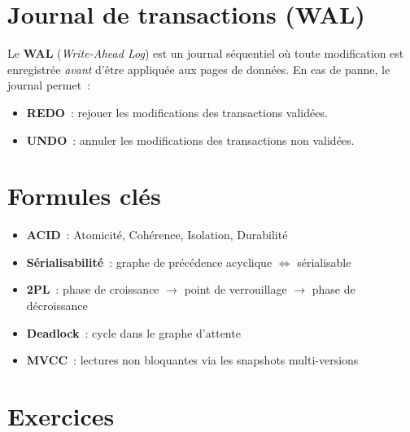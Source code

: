 \section{Journal de transactions (WAL)}

\begin{definition}
Le \textbf{WAL} (\emph{Write-Ahead Log}) est un journal s\'equentiel o\`u
toute modification est enregistr\'ee \emph{avant} d'\^etre appliqu\'ee aux
pages de donn\'ees. En cas de panne, le journal permet~:
\begin{itemize}
  \item \textbf{REDO}~: rejouer les modifications des transactions valid\'ees.
  \item \textbf{UNDO}~: annuler les modifications des transactions non valid\'ees.
\end{itemize}
\end{definition}

\section{Formules cl\'es}

\begin{formules}
\begin{itemize}
  \item \textbf{ACID}~: Atomicit\'e, Coh\'erence, Isolation, Durabilit\'e
  \item \textbf{S\'erialisabilit\'e}~: graphe de pr\'ec\'edence acyclique $\Leftrightarrow$ s\'erialisable
  \item \textbf{2PL}~: phase de croissance $\to$ point de verrouillage $\to$ phase de d\'ecroissance
  \item \textbf{Deadlock}~: cycle dans le graphe d'attente
  \item \textbf{MVCC}~: lectures non bloquantes via les snapshots multi-versions
\end{itemize}
\end{formules}

\section{Exercices}


